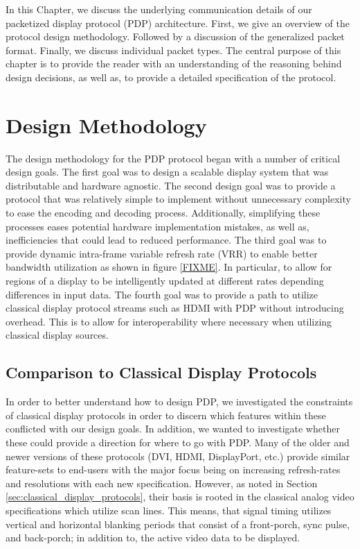 \label{chap:pdp_protocol}

In this Chapter, we discuss the underlying communication details of our packetized display protocol (PDP) architecture. First, we give an overview of the protocol design methodology. Followed by a discussion of the generalized packet format. Finally, we discuss individual packet types. The central purpose of this chapter is to provide the reader with an understanding of the reasoning behind design decisions, as well as, to provide a detailed specification of the protocol.

\section{Design Methodology}

    The design methodology for the PDP protocol began with a number of critical design goals. The first goal was to design a scalable display system that was distributable and hardware agnostic. The second design goal was to provide a protocol that was relatively simple to implement without unnecessary complexity to ease the encoding and decoding process. Additionally, simplifying these processes eases potential hardware implementation mistakes, as well as, inefficiencies that could lead to reduced performance. The third goal was to provide dynamic intra-frame variable refresh rate (VRR) to enable better bandwidth utilization as shown in figure \ref{FIXME}. In particular, to allow for regions of a display to be intelligently updated at different rates depending differences in input data. The fourth goal was to provide a path to utilize classical display protocol streams such as HDMI with PDP without introducing overhead. This is to allow for interoperability where necessary when utilizing classical display sources.

    \subsection{Comparison to Classical Display Protocols}

        In order to better understand how to design PDP, we investigated the constraints of classical display protocols in order to discern which features within these conflicted with our design goals. In addition, we wanted to investigate whether these could provide a direction for where to go with PDP. Many of the older and newer versions of these protocols (DVI\cite{DDWG1999}, HDMI\cite{HDMIForum2018}, DisplayPort\cite{VESA2016}, etc.) provide similar feature-sets to end-users with the major focus being on increasing refresh-rates and resolutions with each new specification. However, as noted in Section \ref{sec:classical_display_protocols}, their basis is rooted in the classical analog video specifications which utilize scan lines\cite{Neal1998}. This means, that signal timing utilizes vertical and horizontal blanking periods that consist of a front-porch, sync pulse, and back-porch; in addition to, the active video data to be displayed.

